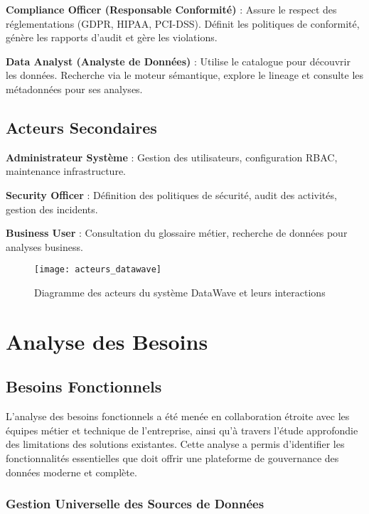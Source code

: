 \textbf{Compliance Officer (Responsable Conformité)} : Assure le respect des réglementations (GDPR, HIPAA, PCI-DSS). Définit les politiques de conformité, génère les rapports d'audit et gère les violations.

\textbf{Data Analyst (Analyste de Données)} : Utilise le catalogue pour découvrir les données. Recherche via le moteur sémantique, explore le lineage et consulte les métadonnées pour ses analyses.

\subsection{Acteurs Secondaires}

\textbf{Administrateur Système} : Gestion des utilisateurs, configuration RBAC, maintenance infrastructure.

\textbf{Security Officer} : Définition des politiques de sécurité, audit des activités, gestion des incidents.

\textbf{Business User} : Consultation du glossaire métier, recherche de données pour analyses business.

\begin{figure}[htpb]
\centering
\texttt{[image: acteurs\_datawave]}
\caption{Diagramme des acteurs du système DataWave et leurs interactions}
\label{fig:acteurs_datawave}
\end{figure}

\section{Analyse des Besoins}

\subsection{Besoins Fonctionnels}

L'analyse des besoins fonctionnels a été menée en collaboration étroite avec les équipes métier et technique de l'entreprise, ainsi qu'à travers l'étude approfondie des limitations des solutions existantes. Cette analyse a permis d'identifier les fonctionnalités essentielles que doit offrir une plateforme de gouvernance des données moderne et complète.

\subsubsection{Gestion Universelle des Sources de Données}

